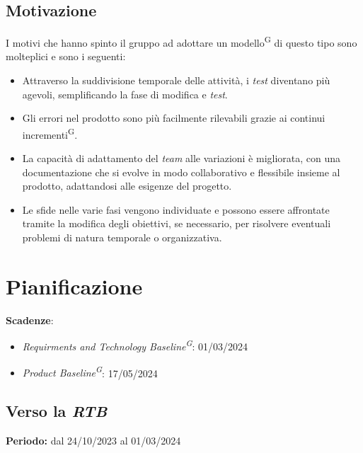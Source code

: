 \documentclass[5pt]{article}
\begin{document}
  \subsection{Motivazione}
    I motivi che hanno spinto il gruppo ad adottare un modello\textsuperscript{G} di questo tipo sono molteplici e sono i seguenti:
    \begin{itemize}
        \item Attraverso la suddivisione temporale delle attività, i \textit{test} diventano più agevoli, semplificando la fase di modifica e \textit{test}.
        \item Gli errori nel prodotto sono più facilmente rilevabili grazie ai continui incrementi\textsuperscript{G}.
        \item La capacità di adattamento del \textit{team} alle variazioni è migliorata, con una documentazione che si evolve in modo collaborativo e flessibile insieme al prodotto, adattandosi alle esigenze del progetto.
        \item Le sfide nelle varie fasi vengono individuate e possono essere affrontate tramite la modifica degli obiettivi, se necessario, per risolvere eventuali problemi di natura temporale o organizzativa.
    \end{itemize}


\section{Pianificazione}
  \textbf{Scadenze}:
  \begin{itemize}
      \item \textit{Requirments and Technology Baseline\textsuperscript{G}}: 01/03/2024
      \item \textit{Product Baseline\textsuperscript{G}}: 17/05/2024
  \end{itemize}

  \subsection{Verso la \textit{RTB}}
    \textbf{Periodo:} dal 24/10/2023 al 01/03/2024
\end{document}
